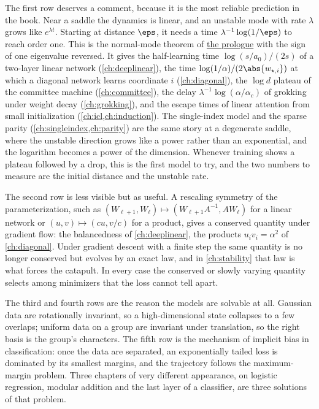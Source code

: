 \begin{refsection}
The first row deserves a comment, because it is the most reliable prediction in the book. Near a saddle the dynamics is linear, and an unstable mode with rate $\lambda$ grows like $e^{\lambda t}$. Starting at distance $\eps$, it needs a time $\lambda^{-1}\log(1/\eps)$ to reach order one. This is the normal-mode theorem of \hyperref[ch:prologue]{the prologue} with the sign of one eigenvalue reversed. It gives the half-learning time $\log(s/a_0)/(2s)$ of a two-layer linear network (\cref{ch:deeplinear}), the time $\log(1/\alpha)/(2\abs{w_{\star,i}})$ at which a diagonal network learns coordinate $i$ (\cref{ch:diagonal}), the $\log d$ plateau of the committee machine (\cref{ch:committee}), the delay $\lambda^{-1}\log(\alpha/\alpha_c)$ of grokking under weight decay (\cref{ch:grokking}), and the escape times of linear attention from small initialization (\cref{ch:icl,ch:induction}). The single-index model and the sparse parity (\cref{ch:singleindex,ch:parity}) are the same story at a degenerate saddle, where the unstable direction grows like a power rather than an exponential, and the logarithm becomes a power of the dimension. Whenever training shows a plateau followed by a drop, this is the first model to try, and the two numbers to measure are the initial distance and the unstable rate.

The second row is less visible but as useful. A rescaling symmetry of the parameterization, such as $(W_{\ell+1},W_\ell)\mapsto(W_{\ell+1}A^{-1},AW_\ell)$ for a linear network or $(u,v)\mapsto(cu,v/c)$ for a product, gives a conserved quantity under gradient flow: the balancedness of \cref{ch:deeplinear}, the products $u_iv_i=\alpha^2$ of \cref{ch:diagonal}. Under gradient descent with a finite step the same quantity is no longer conserved but evolves by an exact law, and in \cref{ch:stability} that law is what forces the catapult. In every case the conserved or slowly varying quantity selects among minimizers that the loss cannot tell apart.

The third and fourth rows are the reason the models are solvable at all. Gaussian data are rotationally invariant, so a high-dimensional state collapses to a few overlaps; uniform data on a group are invariant under translation, so the right basis is the group's characters. The fifth row is the mechanism of implicit bias in classification: once the data are separated, an exponentially tailed loss is dominated by its smallest margins, and the trajectory follows the maximum-margin problem. Three chapters of very different appearance, on logistic regression, modular addition and the last layer of a classifier, are three solutions of that problem.


\end{refsection}
